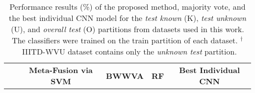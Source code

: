 %
\begin{table*}[!hb]
\centering
\caption{Performance results (\%) of the proposed method, majority vote, and the best individual CNN model for the \emph{test known} (K), \emph{test unknown} (U), and \emph{overall test} (O) partitions from datasets used in this work. The classifiers were trained on the train partition of each dataset. $^\dagger$~IIITD-WVU dataset contains only the \emph{unknown test} partition.}
\setlength{\tabcolsep}{3.5pt}
\begin{tabular}{cc||c|c|c||c|c|c||c|c|c||c|c|c}
    \toprule
				     & 						& \multicolumn{3}{c||}{\textbf{Meta-Fusion via SVM}} 
										    & \multicolumn{3}{c||}{\textbf{BWWVA}}
										    & \multicolumn{3}{c||}{\textbf{RF}}
										    & \multicolumn{3}{c}{\textbf{Best Individual CNN}} \\


\end{tabular}
\end{table*}
